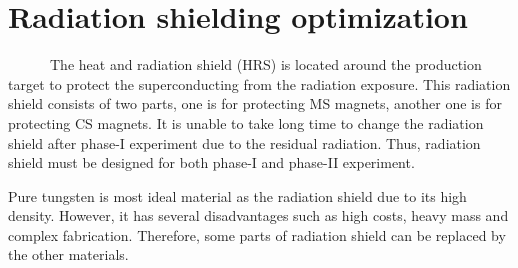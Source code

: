 \section{Radiation shielding optimization}
~~~~~~The heat and radiation shield (HRS) is located around the production target to protect the superconducting from the radiation exposure.
This radiation shield consists of two parts, one is for protecting MS magnets, another one is for protecting CS magnets.
It is unable to take long time to change the radiation shield after phase-I experiment due to the residual radiation.
Thus, radiation shield must be designed for both phase-I and phase-II experiment.

Pure tungsten is most ideal material as the radiation shield due to its high density.
However, it has several disadvantages such as high costs, heavy mass and complex fabrication.
Therefore, some parts of radiation shield can be replaced by the other materials.

